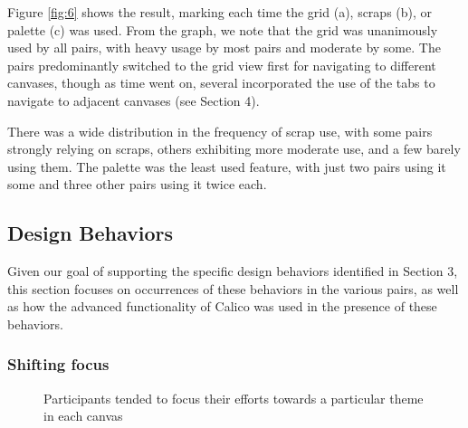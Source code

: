Figure \ref{fig:6} shows the result, marking each time the grid (a), scraps (b), or palette (c) was used. From the graph, we note that the grid was unanimously used by all pairs, with heavy usage by most pairs and moderate by some. The pairs predominantly switched to the grid view first for navigating to different canvases, though as time went on, several incorporated the use of the tabs to navigate to adjacent canvases (see Section 4). 

There was a wide distribution in the frequency of scrap use, with some pairs strongly relying on scraps, others exhibiting more moderate use, and a few barely using them. The palette was the least used feature, with just two pairs using it some and three other pairs using it twice each.

\subsection {Design Behaviors}
\label {results:2}

Given our goal of supporting the specific design behaviors identified in Section 3, this section focuses on occurrences of these behaviors in the various pairs, as well as how the advanced functionality of Calico was used in the presence of these behaviors.

\subsubsection {Shifting focus}
\label{results:21}

\begin{figure}%
  \centering
   \caption {Participants tended to focus their efforts towards a particular theme in each canvas}
   \label{fig:7}
\end{figure}%

